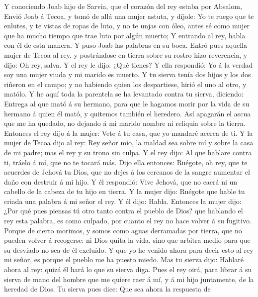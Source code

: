  Y conociendo Joab hijo de Sarvia, que el corazón del rey
estaba por Absalom,  Envió Joab á Tecoa, y tomó de allá
una mujer astuta, y díjole: Yo te ruego que te enlutes, y te vistas de
ropas de luto, y no te unjas con óleo, antes sé como mujer que ha mucho
tiempo que trae luto por algún muerto;  Y entrando al rey,
habla con él de esta manera. Y puso Joab las palabras en su boca.
 Entró pues aquella mujer de Tecoa al rey, y postrándose
en tierra sobre su rostro hizo reverencia, y dijo: Oh rey, salva.
 Y el rey le dijo: ¿Qué tienes? Y ella respondió: Yo á la
verdad soy una mujer viuda y mi marido es muerto.  Y tu
sierva tenía dos hijos y los dos riñeron en el campo; y no habiendo
quien los despartiese, hirió el uno al otro, y matólo.  Y
he aquí toda la parentela se ha levantado contra tu sierva, diciendo:
Entrega al que mató á su hermano, para que le hagamos morir por la vida
de su hermano á quien él mató, y quitemos también el heredero. Así
apagarán el ascua que me ha quedado, no dejando á mi marido nombre ni
reliquia sobre la tierra.  Entonces el rey dijo á la
mujer: Vete á tu casa, que yo mandaré acerca de ti.  Y la
mujer de Tecoa dijo al rey: Rey señor mío, la maldad sea sobre mí y
sobre la casa de mi padre; mas el rey y su trono sin culpa.
 Y el rey dijo: Al que hablare contra ti, tráelo á mí,
que no te tocará más.  Dijo ella entonces: Ruégote, oh
rey, que te acuerdes de Jehová tu Dios, que no dejes á los cercanos de
la sangre aumentar el daño con destruir á mi hijo. Y él respondió: Vive
Jehová, que no caerá ni un cabello de la cabeza de tu hijo en tierra.
 Y la mujer dijo: Ruégote que hable tu criada una palabra
á mi señor el rey. Y él dijo: Habla.  Entonces la mujer
dijo: ¿Por qué pues piensas tú otro tanto contra el pueblo de Dios? que
hablando el rey esta palabra, es como culpado, por cuanto el rey no hace
volver á su fugitivo.  Porque de cierto morimos, y somos
como aguas derramadas por tierra, que no pueden volver á recogerse: ni
Dios quita la vida, sino que arbitra medio para que su desviado no sea
de él excluído.  Y que yo he venido ahora para decir esto
al rey mi señor, es porque el pueblo me ha puesto miedo. Mas tu sierva
dijo: Hablaré ahora al rey: quizá él hará lo que su sierva diga.
 Pues el rey oirá, para librar á su sierva de mano del
hombre que me quiere raer á mí, y á mi hijo juntamente, de la heredad de
Dios.  Tu sierva pues dice: Que sea ahora la respuesta de
